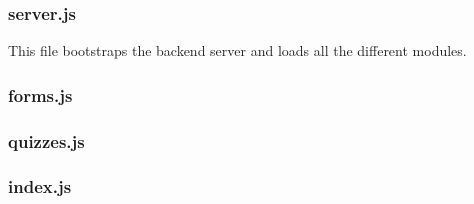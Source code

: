 \subsubsection{server.js} %
This file bootstraps the backend server and loads all the different modules.


\subsubsection{forms.js} %


\subsubsection{quizzes.js} %


\subsubsection{index.js} %

